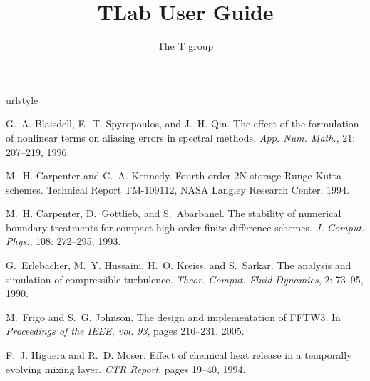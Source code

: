 \documentclass[a4paper,11pt]{book}
\title{{\bf T}\textcolor{black!50}{Lab} User Guide}
\author{The T group}
\begin{document}
\frontmatter
\pagestyle{empty}
\maketitle
\tableofcontents

\setlength{\parskip}{0.5\baselineskip}


\mainmatter
\pagestyle{fancy}










\backmatter


%
\begin{thebibliography}{20}
\providecommand{\natexlab}[1]{#1}
\providecommand{\url}[1]{\texttt{#1}}
\expandafter\ifx\csname urlstyle\endcsname\relax
  \providecommand{\doi}[1]{doi: #1}\else
  \providecommand{\doi}{doi: \begingroup \urlstyle{rm}\Url}\fi

G.~A. Blaisdell, E.~T. Spyropoulos, and J.~H. Qin.
\newblock The effect of the formulation of nonlinear terms on aliasing errors
  in spectral methods.
\newblock \emph{App. Num. Math.}, 21: 207--219, 1996.

M.~H. Carpenter and C.~A. Kennedy.
\newblock Fourth-order 2{N}-storage {R}unge-{K}utta schemes.
\newblock Technical Report TM-109112, NASA Langley Research Center, 1994.

M.~H. Carpenter, D.~Gottlieb, and S.~Abarbanel.
\newblock The stability of numerical boundary treatments for compact high-order
  finite-difference schemes.
\newblock \emph{J. Comput. Phys.}, 108: 272--295, 1993.

G.~Erlebacher, M.~Y. Hussaini, H.~O. Kreiss, and S.~Sarkar.
\newblock The analysis and simulation of compressible turbulence.
\newblock \emph{Theor. Comput. Fluid Dynamics}, 2: 73--95, 1990.

M.~Frigo and S.~G. Johnson.
\newblock The design and implementation of {FFTW3}.
\newblock In \emph{Proceedings of the {IEEE}, vol. 93}, pages 216--231, 2005.

F.~J. Higuera and R.~D. Moser.
\newblock Effect of chemical heat release in a temporally evolving mixing
  layer.
\newblock \emph{CTR Report}, pages 19--40, 1994.


\end{thebibliography}
\end{document}
